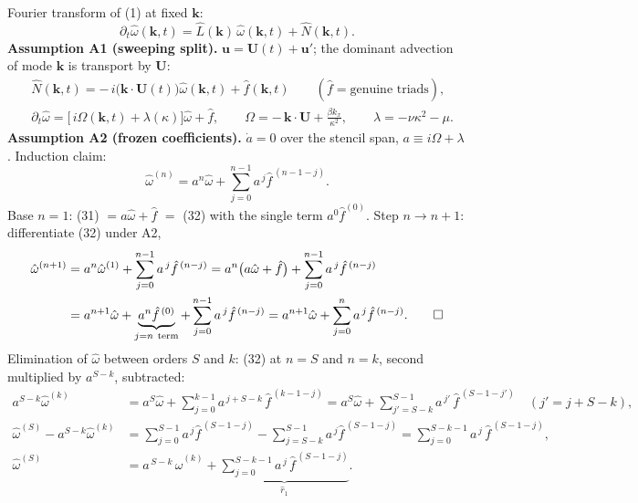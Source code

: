 \documentclass[11pt]{article}
\begin{document}
Fourier transform of (1) at fixed $\mathbf{k}$:
\begin{equation}
\partial_t\hat\omega(\mathbf{k},t)
=\hat L(\mathbf{k})\,\hat\omega(\mathbf{k},t)+\hat N(\mathbf{k},t).
\end{equation}
\textbf{Assumption A1 (sweeping split).}
$\mathbf{u}=\mathbf{U}(t)+\mathbf{u}'$; the dominant advection of mode
$\mathbf{k}$ is transport by $\mathbf{U}$:
\begin{align}
&\hat N(\mathbf{k},t)
=-\,i\bigl(\mathbf{k}\!\cdot\!\mathbf{U}(t)\bigr)\hat\omega(\mathbf{k},t)
+\hat f(\mathbf{k},t)
\qquad(\hat f=\text{genuine triads}),\\
&\partial_t\hat\omega
=\bigl[\,i\Omega(\mathbf{k},t)+\lambda(\kappa)\bigr]\hat\omega
+\hat f,\qquad
\Omega=-\,\mathbf{k}\!\cdot\!\mathbf{U}+\frac{\beta k_x}{\kappa^{2}},\qquad
\lambda=-\nu\kappa^{2}-\mu .
\end{align}
\textbf{Assumption A2 (frozen coefficients).}
$\dot a=0$ over the stencil span, $a\equiv i\Omega+\lambda$.
Induction claim:
\begin{equation}
\hat\omega^{(n)}=a^{n}\hat\omega
+\sum_{j=0}^{n-1}a^{\,j}\hat f^{\,(n-1-j)} .
\end{equation}
Base $n=1$: (31) $=a\hat\omega+\hat f$ $=$ (32) with the single term
$a^{0}\hat f^{(0)}$. Step $n\to n+1$: differentiate (32) under A2,
\begin{align}
\hat\omega^{(n+1)}
&=a^{n}\hat\omega^{(1)}+\sum_{j=0}^{n-1}a^{\,j}\hat f^{\,(n-j)}
=a^{n}\bigl(a\hat\omega+\hat f\bigr)
+\sum_{j=0}^{n-1}a^{\,j}\hat f^{\,(n-j)}\notag\\
&=a^{n+1}\hat\omega
+\underbrace{a^{n}\hat f^{\,(0)}}_{j=n\ \text{term}}
+\sum_{j=0}^{n-1}a^{\,j}\hat f^{\,(n-j)}
=a^{n+1}\hat\omega+\sum_{j=0}^{n}a^{\,j}\hat f^{\,(n-j)}.\qquad\square
\end{align}
Elimination of $\hat\omega$ between orders $S$ and $k$: (32) at $n=S$ and
$n=k$, second multiplied by $a^{S-k}$, subtracted:
\begin{align}
a^{S-k}\hat\omega^{(k)}
&=a^{S}\hat\omega+\sum_{j=0}^{k-1}a^{\,j+S-k}\,\hat f^{\,(k-1-j)}
=a^{S}\hat\omega+\sum_{j'=S-k}^{S-1}a^{\,j'}\,\hat f^{\,(S-1-j')}
\quad(j'=j+S-k),\\
\hat\omega^{(S)}-a^{S-k}\hat\omega^{(k)}
&=\sum_{j=0}^{S-1}a^{\,j}\hat f^{\,(S-1-j)}
-\sum_{j=S-k}^{S-1}a^{\,j}\hat f^{\,(S-1-j)}
=\sum_{j=0}^{S-k-1}a^{\,j}\,\hat f^{\,(S-1-j)},\\
\hat\omega^{(S)}
&=a^{\,S-k}\,\hat\omega^{(k)}
+\underbrace{\sum_{j=0}^{S-k-1}a^{\,j}\,
\hat f^{\,(S-1-j)}}_{\displaystyle \hat r_1}.
\end{align}
\end{document}
